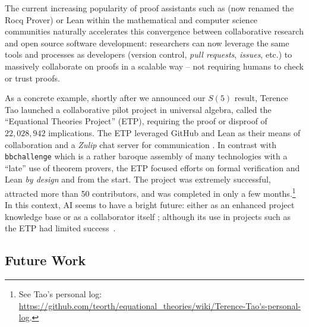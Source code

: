 \documentclass[a4paper,british]{article}
\theoremstyle{definition} %
\numberwithin{equation}{section}
\theoremstyle{definition} %
\begin{document}
The current increasing popularity of proof assistants such as \Coq (now renamed the Rocq Prover) or Lean within the mathematical and computer science communities naturally accelerates this convergence between collaborative research and open source software development: researchers can now leverage the same tools and processes as developers (version control, \textit{pull requests}, \textit{issues}, etc.) to massively collaborate on proofs in a scalable way -- \ie not requiring humans to check or trust proofs.

As a concrete example, shortly after we announced our $S(5)$ result, Terence Tao launched a collaborative pilot project in universal algebra, called the ``Equational Theories Project'' (ETP), requiring the proof or disproof of $22{,}028{,}942$ implications. The ETP leveraged GitHub and Lean as their means of collaboration and a \textit{Zulip} chat server for communication \cite{TaoBlog, ETPGithub, ETPpaper}. In contrast with \texttt{bbchallenge} which is a rather baroque assembly of many technologies with a ``late'' use of theorem provers, the ETP focused efforts on formal verification and Lean \textit{by design} and from the start. The project was extremely successful, attracted more than 50 contributors, and was completed in only a few months.\footnote{See Tao's personal log: \url{https://github.com/teorth/equational_theories/wiki/Terence-Tao's-personal-log}.} In this context, AI seems to have a bright future: either as an enhanced project knowledge base or as a collaborator itself \cite{Trinh2024, wu2024internlm25stepproveradvancingautomatedtheorem}; although its use in projects such as the ETP had limited success~\cite{ETPpaper}.


































\subsection{Future Work}\label{sec:fw}
\end{document}
